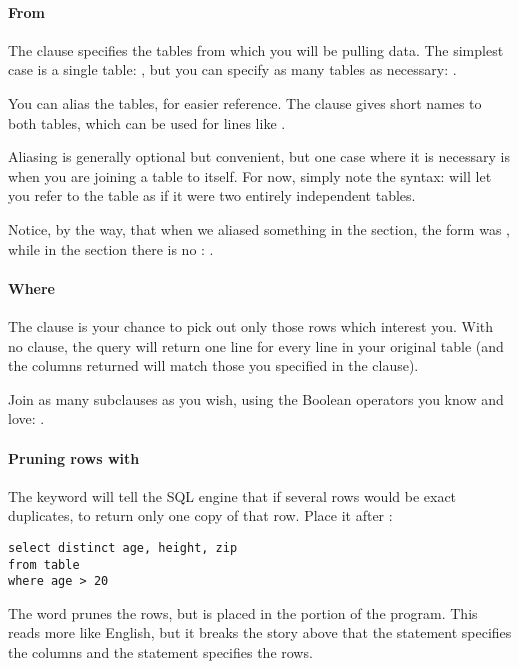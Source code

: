 \paragraph{From} The  clause specifies the tables from which
you will be pulling data. The simplest case is a single table: , but you can specify as many tables as necessary: . 

You can alias the tables, for easier reference. The clause 
 gives short names to both tables, which can
be used for lines like . 

Aliasing is generally optional but convenient, but one case where
it is necessary is when you are joining a table to itself.
For now, simply note the syntax:  will let
you refer to the  table as if it were two entirely independent
tables. 

Notice, by the way, that when we aliased something in the 
section, the form was , while
in the  section there is no : .

\paragraph{Where}
The  clause is your chance to pick out only those rows which
interest you. With no  clause, the query will return one line
for every line in your original table (and the columns returned will
match those you specified in the  clause).

Join as many subclauses as you wish, using the Boolean operators you
know and love: .


\paragraph{Pruning rows with } The 
keyword will tell the SQL engine that if several rows would be exact
duplicates, to return only one copy of that row. Place it after 
: 
\begin{lstlisting}
select distinct age, height, zip
from table
where age > 20
\end{lstlisting}
The   word prunes the rows, but is placed in the 
 portion of the program.  This reads more like English, but it
breaks the story above that the  statement specifies the
columns and the  statement specifies the rows.

